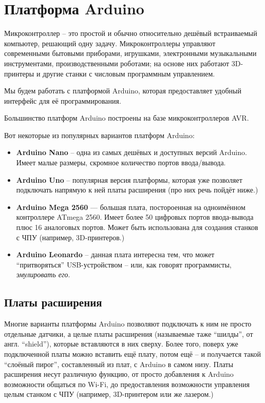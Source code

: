 \documentclass[../sparc.tex]{subfiles}
\begin{document}
\section{Платформа Arduino}


Микроконтроллер -- это простой и обычно относительно дешёвый встраиваемый
компьютер, решающий одну задачу.  Микроконтроллеры управляют современными
бытовыми приборами, игрушками, электронными музыкальными инструментами,
производственными роботами; на основе них работают 3D-принтеры и другие станки с
числовым программным управлением.

Мы будем работать с платформой Arduino, которая предоставляет удобный интерфейс
для её программирования.

Большинство платформ Arduino построены на базе микроконтроллеров AVR.

Вот некоторые из популярных вариантов платформ Arduino:
\begin{itemize}
\item \textbf{Arduino Nano} -- одна из самых дешёвых и доступных версий Arduino.
  Имеет малые размеры, скромное количество портов ввода/вывода.
\item \textbf{Arduino Uno} -- популярная версия платформы, которая уже позволяет
  подключать напрямую к ней платы расширения (про них речь пойдёт ниже.)
\item \textbf{Arduino Mega 2560} --- большая плата, постороенная на одноимённом
  контроллере ATmega 2560.  Имеет более 50 цифровых портов ввода-вывода плюс 16
  аналоговых портов.  Может быть использована для создания станков с \gls{ЧПУ}
  (например, 3D-принтеров.)
\item \textbf{Arduino Leonardo} -- данная плата интересна тем, что может
  ``притворяться'' USB-устройством -- или, как говорят программисты,
  \emph{эмулировать его}.
\end{itemize}

\subsection{Платы расширения}

Многие варианты платформы Arduino позволяют подключать к ним не просто отдельные
датчики, а целые платы расширения (называемые таже ``шилды'', от
англ. ``shield''), которые вставляются в них сверху.  Более того, поверх уже
подключенной платы можно вставить ещё плату, потом ещё -- и получается такой
``слоёный пирог'', составленный из плат, с Arduino в самом низу.  Платы
расширения несут различную функцию, от просто добавления к Arduino возможности
общаться по Wi-Fi, до предоставления возможности управления целым станком с
\gls{ЧПУ} (например, 3D-принтером или же лазером.)
\end{document}
